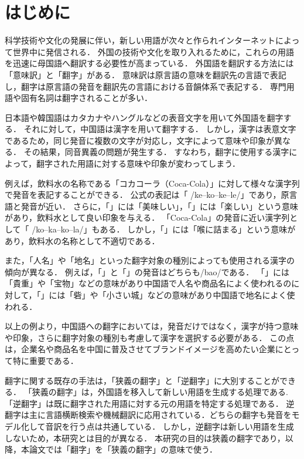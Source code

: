 \documentclass[japanese]{jnlp_1.4}
\begin{document}
\maketitle


\section{はじめに}

科学技術や文化の発展に伴い，新しい用語が次々と作られインターネットによって世界中に発信される．
外国の技術や文化を取り入れるために，これらの用語を迅速に母国語へ翻訳する必要性が高まっている．
外国語を翻訳する方法には「意味訳」と「翻字」がある．
意味訳は原言語の意味を翻訳先の言語で表記し，翻字は原言語の発音を翻訳先の言語における音韻体系で表記する．
専門用語や固有名詞は翻字されることが多い．

日本語や韓国語はカタカナやハングルなどの表音文字を用いて外国語を翻字する．
それに対して，中国語は漢字を用いて翻字する．
しかし，漢字は表意文字であるため，同じ発音に複数の文字が対応し，文字によって意味や印象が異なる．
その結果，同音異義の問題が発生する．
すなわち，翻字に使用する漢字によって，翻字された用語に対する意味や印象が変わってしまう．

例えば，飲料水の名称である「コカコーラ（Coca-Cola）」に対して様々な漢字列で発音を表記することができる．
公式の表記は「 /ke--ko--ke--le/」であり，原言語と発音が近い．
さらに，「」には「美味しい」，「」には「楽しい」という意味があり，飲料水として良い印象を与える．
「Coca-Cola」の発音に近い漢字列として「 /ko--ka--ko--la/」もある．
しかし，「」には「喉に詰まる」という意味があり，飲料水の名称として不適切である．

また，「人名」や「地名」といった翻字対象の種別によっても使用される漢字の傾向が異なる．
例えば，「」と「」の発音はどちらも/bao/である．
「」には「貴重」や「宝物」などの意味があり中国語で人名や商品名によく使われるのに対して，「」には「砦」や「小さい城」などの意味があり中国語で地名によく使われる．

以上の例より，中国語への翻字においては，発音だけではなく，漢字が持つ意味や印象，さらに翻字対象の種別も考慮して漢字を選択する必要がある．
この点は，企業名や商品名を中国に普及させてブランドイメージを高めたい企業にとって特に重要である．

翻字に関する既存の手法は，「狭義の翻字」と「逆翻字」に大別することができる．
「狭義の翻字」は，外国語を移入して新しい用語を生成する処理である\cite{Article_10,Article_11,Article_16,Article_18}.
「逆翻字」は既に翻字された用語に対する元の用語を特定する処理である\cite{Article_01,Article_02,Article_04,Article_05,Article_06,Article_07,Article_08,Article_09,Article_12,Article_14}．
逆翻字は主に言語横断検索や機械翻訳に応用されている．どちらの翻字も発音をモデル化して音訳を行う点は共通している．
しかし，逆翻字は新しい用語を生成しないため，本研究とは目的が異なる．
本研究の目的は狭義の翻字であり，以降，本論文では「翻字」を「狭義の翻字」の意味で使う．
\end{document}
